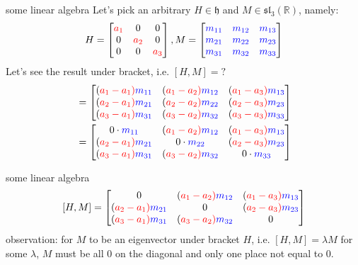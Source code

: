 \documentclass{beamer}
\newcommand{\R}{\mathbb{R}}
\begin{document}
\begin{frame}{some linear algebra}
	Let's pick an arbitrary $H \in \mathfrak{h}$ and $M \in \mathfrak{sl}_3(\R)$, namely: \[
		H = \def\a{\color{red}a} \begin{bmatrix} \a_1 & 0 & 0 \\ 0 & \a_2 &0 \\ 0 &0 &\a_3 \end{bmatrix}, M = \def\m{\color{blue}m} \begin{bmatrix} \m_{11} & \m_{12} & \m_{13} \\ \m_{21} & \m_{22} & \m_{23} \\ \m_{31} & \m_{32} & \m_{33} \end{bmatrix} 
	\]
	Let's see the result under bracket, i.e. $[H,M] = ?$
	\begin{align*}
		[D,M] &= \def\a{\color{red}a} \def\m{\color{blue}m} \begin{bmatrix} (\a_1-\a_1)\m_{11} & (\a_1-\a_2)\m_{12} & (\a_1-\a_3)\m_{13} \\ (\a_2-\a_1)\m_{21} & (\a_2-\a_2)\m_{22} & (\a_2-\a_3)\m_{23} \\ (\a_3-\a_1)\m_{31} & (\a_3-\a_2)\m_{32} & (\a_3-\a_3)\m_{33} \end{bmatrix} \\
		      &=  \def\a{\color{red}a} \def\m{\color{blue}m} \begin{bmatrix} 0 \cdot \m_{11} & (\a_1-\a_2)\m_{12} & (\a_1-\a_3)\m_{13} \\ (\a_2-\a_1)\m_{21} & 0 \cdot \m_{22} & (\a_2-\a_3)\m_{23} \\ (\a_3-\a_1)\m_{31} & (\a_3-\a_2)\m_{32} & 0 \cdot \m_{33} \end{bmatrix} 
	\end{align*}
\end{frame}

\begin{frame}{some linear algebra}
	\[ [H,M] = \def\a{\color{red}a} \def\m{\color{blue}m} \begin{bmatrix} 0& (\a_1-\a_2)\m_{12} & (\a_1-\a_3)\m_{13} \\ (\a_2-\a_1)\m_{21} & 0& (\a_2-\a_3)\m_{23} \\ (\a_3-\a_1)\m_{31} & (\a_3-\a_2)\m_{32} & 0 \end{bmatrix} \] 
	\def\a{\color{red}a}
	observation: for $M$ to be an eigenvector under bracket  $H$, i.e.  $[H,M] = \lambda M$ for some  $\lambda$,  $M$ must be all  $0$ on the diagonal and only one place not equal to  $0$. 


\end{frame}
\end{document}
